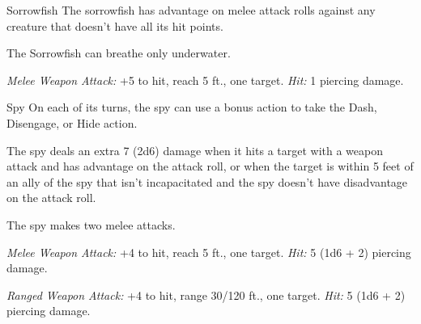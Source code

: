 \documentclass[10pt,a4paper,twoside,twocolumn,openany,nodeprecatedcode]{dndbook}
\begin{document}
\begin{DndMonster}[float=ht]{Sorrowfish}
\DndMonsterBasics[
armor-class = {13},
hit-points = {\DndDice{1d4 - 1}},
speed = {0 ft., 40 ft. (key)}
]
\DndMonsterAbilityScores[
 str = 2,
 dex = 16,
 con = 9,
 int = 1,
 wis = 7,
 cha = 2
]
\DndMonsterDetails[
damage-immunities = {psychic},
senses = {darkvision 60 ft., passive perception 8},
challenge = 0,
]
The sorrowfish has advantage on melee attack rolls against any creature that doesn't have all its hit points.

The Sorrowfish can breathe only underwater.

\par
{}
\textsl{Melee Weapon Attack:} +5 to hit, reach 5 ft., one target. \textsl{Hit:} 1 piercing damage.

\end{DndMonster}


\clearpage
{}

\begin{DndMonster}[float=ht]{Spy}
\DndMonsterBasics[
armor-class = {12},
hit-points = {\DndDice{6d8}},
speed = {30 ft.}
]
\DndMonsterAbilityScores[
 str = 10,
 dex = 15,
 con = 10,
 int = 12,
 wis = 14,
 cha = 16
]
\DndMonsterDetails[
skills = {Deception +5, Insight +4, Investigation +5, Perception +6, Persuasion +5, Sleight Of Hand +4, Stealth +4},
languages = {any two languages},
challenge = 1,
]
On each of its turns, the spy can use a bonus action to take the Dash, Disengage, or Hide action.

The spy deals an extra 7 (2d6) damage when it hits a target with a weapon attack and has advantage on the attack roll, or when the target is within 5 feet of an ally of the spy that isn't incapacitated and the spy doesn't have disadvantage on the attack roll.

\par
{}
The spy makes two melee attacks.

\textsl{Melee Weapon Attack:} +4 to hit, reach 5 ft., one target. \textsl{Hit:} 5 (1d6 + 2) piercing damage.

\textsl{Ranged Weapon Attack:} +4 to hit, range 30/120 ft., one target. \textsl{Hit:} 5 (1d6 + 2) piercing damage.

\end{DndMonster}
\end{document}
